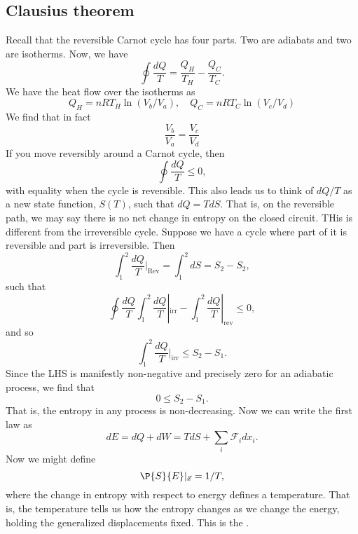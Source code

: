 \subsection*{Clausius theorem}
Recall that the reversible Carnot cycle has four parts. Two are adiabats and two are isotherms. Now, we have
\begin{equation}
    \oint \frac{dQ}{T} = \frac{Q_H}{T_H} - \frac{Q_C}{T_C}.
\end{equation}
We have the heat flow over the isotherms as
\begin{equation}
    Q_H = nRT_H \ln(V_b/V_a), \quad Q_C = nRT_C \ln(V_c/V_d)
\end{equation}
We find that in fact
\begin{equation}
    \frac{V_b}{V_a} = \frac{V_c}{V_d}
\end{equation}
If you move reversibly around a Carnot cycle, then
\begin{equation}
    \oint \frac{dQ}{T} \leq 0,
\end{equation}
with equality when the cycle is reversible. This also leads us to think of $dQ/T$ as a new state function, $S(T)$, such that $dQ = TdS$. That is, on the reversible path, we may say there is no net change in entropy on the closed circuit. THis is different from the irreversible cycle. Suppose we have a cycle where part of it is reversible and part is irreversible. Then
\begin{equation}
    \int_1^2 \frac{dQ}{T}|_\text{Rev} =\int_1^2 dS = S_2 - S_2,
\end{equation}
such that
\begin{equation}
    \oint \frac{dQ}{T} \int_1^2 \frac{dQ}{T}|_\text{irr} - \int_1^2 \frac{dQ}{T}|_\text{rev} \leq 0,
\end{equation}
and so
\begin{equation}
    \int_1^2 \frac{dQ}{T}|_\text{irr} \leq S_2 -S_1.
\end{equation}
Since the LHS is manifestly non-negative and precisely zero for an adiabatic process, we find that
\begin{equation}
    0\leq S_2-S_1.
\end{equation}
That is, the entropy in any process is non-decreasing. Now we can write the first law as
\begin{equation}
    dE = dQ+ dW = TdS + \sum_i \mathcal{F}_i dx_i.
\end{equation}
Now we might define
\begin{equation}
    \P{S}{E}|_{\vec{x}} = 1/T,
\end{equation}
where the change in entropy with respect to energy defines a temperature. That is, the temperature tells us how the entropy changes as we change the energy, holding the generalized displacements fixed. This is the .

